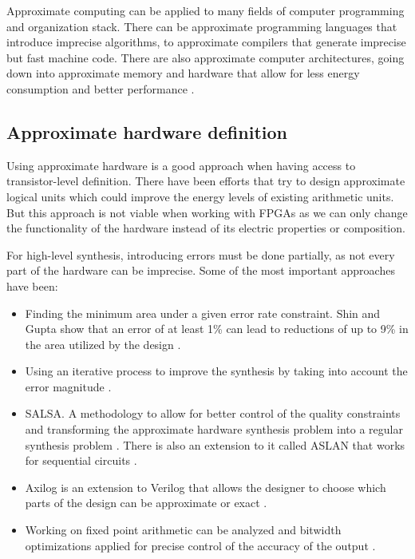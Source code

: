 Approximate computing can be applied to many fields of computer programming and organization stack.
There can be approximate programming languages that introduce imprecise algorithms, 
to approximate compilers that generate imprecise but fast machine code.
There are also approximate computer architectures, going down into approximate 
memory and hardware that allow for 
less energy consumption and better performance \cite{surveyqu}.

\subsection{Approximate hardware definition}

Using approximate hardware is a good approach when having access to transistor-level definition.
There have been efforts that try to design approximate logical units \cite{kim2013energy}\cite{ye2013reconfiguration}
which could improve the energy levels of existing arithmetic units. But this approach is 
not viable when working with FPGAs as we can only change the functionality of the hardware
instead of its electric properties or composition.

For high-level synthesis, introducing errors must be done partially, as not every
part of the hardware can be imprecise. Some of the most important approaches have been:

\begin{itemize}
  \item Finding the minimum area under a given error rate constraint. Shin and Gupta
  show that an error of at least 1\% can lead to reductions of up to 9\% in the area
  utilized by the design \cite{shin2010approximate}.
  \item Using an iterative process to improve the synthesis by taking into account
  the error magnitude \cite{miao2013approximate}.
  \item SALSA. A methodology to allow for better control of the quality constraints
  and transforming the approximate hardware synthesis problem into a regular synthesis
  problem \cite{venkataramani2012salsa}. There is also an extension to it called ASLAN
  that works for sequential circuits \cite{ranjan2014aslan}.
  \item Axilog is an extension to Verilog that allows the designer to choose which parts
  of the design can be approximate or exact \cite{yazdanbakhsh2015axilog}.
  \item Working on fixed point arithmetic can be analyzed and bitwidth optimizations
  applied for precise control of the accuracy of the output \cite{li2015joint}.
\end{itemize}

